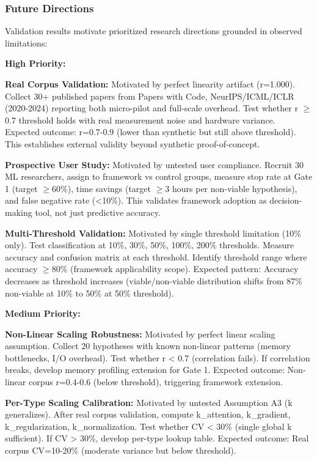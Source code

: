 \subsubsection{Future Directions}

Validation results motivate prioritized research directions grounded in observed limitations:

\textbf{High Priority:}

\textbf{Real Corpus Validation:} Motivated by perfect linearity artifact (r=1.000). Collect 30+ published papers from Papers with Code, NeurIPS/ICML/ICLR (2020-2024) reporting both micro-pilot and full-scale overhead. Test whether r $\geq$ 0.7 threshold holds with real measurement noise and hardware variance. Expected outcome: r=0.7-0.9 (lower than synthetic but still above threshold). This establishes external validity beyond synthetic proof-of-concept.

\textbf{Prospective User Study:} Motivated by untested user compliance. Recruit 30 ML researchers, assign to framework vs control groups, measure stop rate at Gate 1 (target $\geq 60$\%), time savings (target $\geq 3$ hours per non-viable hypothesis), and false negative rate (<10\%). This validates framework adoption as decision-making tool, not just predictive accuracy.

\textbf{Multi-Threshold Validation:} Motivated by single threshold limitation (10\% only). Test classification at 10\%, 30\%, 50\%, 100\%, 200\% thresholds. Measure accuracy and confusion matrix at each threshold. Identify threshold range where accuracy $\geq 80$\% (framework applicability scope). Expected pattern: Accuracy decreases as threshold increases (viable/non-viable distribution shifts from 87\% non-viable at 10\% to 50\% at 50\% threshold).

\textbf{Medium Priority:}

\textbf{Non-Linear Scaling Robustness:} Motivated by perfect linear scaling assumption. Collect 20 hypotheses with known non-linear patterns (memory bottlenecks, I/O overhead). Test whether r < 0.7 (correlation fails). If correlation breaks, develop memory profiling extension for Gate 1. Expected outcome: Non-linear corpus r=0.4-0.6 (below threshold), triggering framework extension.

\textbf{Per-Type Scaling Calibration:} Motivated by untested Assumption A3 (k generalizes). After real corpus validation, compute k\_attention, k\_gradient, k\_regularization, k\_normalization. Test whether CV < 30\% (single global k sufficient). If CV > 30\%, develop per-type lookup table. Expected outcome: Real corpus CV=10-20\% (moderate variance but below threshold).


